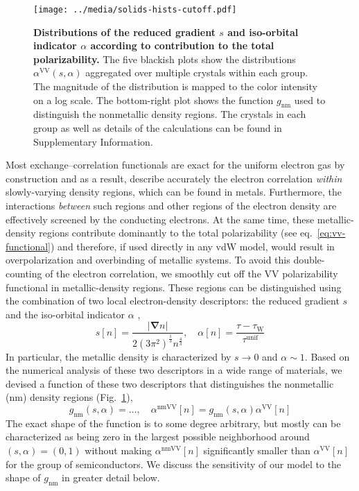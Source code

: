 \begin{figure}[t!]
\centering
\texttt{[image: ../media/solids-hists-cutoff.pdf]}
\caption{\textbf{Distributions of the reduced gradient $s$ and iso-orbital indicator $\alpha$ according to contribution to the total polarizability.}
The five blackish plots show the distributions $\alpha^\text{VV}(s,\alpha)$ aggregated over multiple crystals within each group.
The magnitude of the distribution is mapped to the color intensity on a log scale.
The bottom-right plot shows the function $g_\text{nm}$ used to distinguish the nonmetallic density regions.
The crystals in each group as well as details of the calculations can be found in Supplementary Information.
}\label{fig:solids-hists-cutoff}
\end{figure}

Most exchange--correlation functionals are exact for the uniform electron gas by construction and as a result, describe accurately the electron correlation \emph{within} slowly-varying density regions, which can be found in metals.
Furthermore, the interactions \emph{between} such regions and other regions of the electron density are effectively screened by the conducting electrons.
At the same time, these metallic-density regions contribute dominantly to the total polarizability (see eq.~\ref{eq:vv-functional}) and therefore, if used directly in any vdW model, would result in overpolarization and overbinding of metallic systems.
To avoid this double-counting of the electron correlation, we smoothly cut off the VV polarizability functional in metallic-density regions.
These regions can be distinguished using the combination of two local electron-density descriptors: the reduced gradient $s$ and the iso-orbital indicator $\alpha$ \citep{BeckeJCP90,KummelMP03,SunPRL13},
\begin{equation}
  s[n]=\frac{|\boldsymbol\nabla n|}{2{(3\pi^2)}^\frac13n^\frac43},\quad
  \alpha[n]=\frac{\tau-\tau_\text{W}}{\tau^\text{unif}}
\end{equation}
In particular, the metallic density is characterized by $s\rightarrow0$ and $\alpha\sim1$.
Based on the numerical analysis of these two descriptors in a wide range of materials, we devised a function of these two descriptors that distinguishes the nonmetallic (nm) density regions (Fig.~\ref{fig:solids-hists-cutoff}),
\begin{equation}
  g_\text{nm}(s,\alpha)=\ldots,\quad
  \alpha^\text{nmVV}[n]=g_\text{nm}(s,\alpha)\alpha^\text{VV}[n]
\end{equation}
The exact shape of the function is to some degree arbitrary, but mostly can be characterized as being zero in the largest possible neighborhood around $(s,\alpha)=(0,1)$ without making $\alpha^\text{nmVV}[n]$ significantly smaller than $\alpha^\text{VV}[n]$ for the group of semiconductors.
We discuss the sensitivity of our model to the shape of $g_\text{nm}$ in greater detail below.

